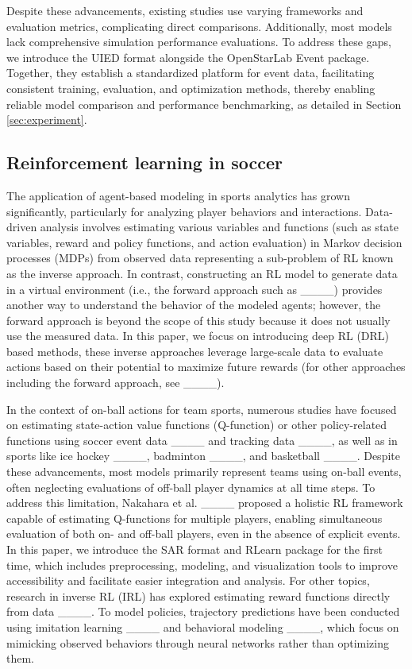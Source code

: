 Despite these advancements, existing studies use varying frameworks and evaluation metrics, complicating direct comparisons. Additionally, most models lack comprehensive simulation performance evaluations. To address these gaps, we introduce the UIED format alongside the OpenStarLab Event package. Together, they establish a standardized platform for event data, facilitating consistent training, evaluation, and optimization methods, thereby enabling reliable model comparison and performance benchmarking, as detailed in Section \ref{sec:experiment}.

\subsection{Reinforcement learning in soccer}
\label{ssec:related_rl_soccer}
The application of agent-based modeling in sports analytics has grown significantly, particularly for analyzing player behaviors and interactions. 
Data-driven analysis involves estimating various variables and functions (such as state variables, reward and policy functions, and action evaluation) in Markov decision processes (MDPs) from observed data representing a sub-problem of RL known as the inverse approach. In contrast, constructing an RL model to generate data in a virtual environment (i.e., the forward approach such as ____) provides another way to understand the behavior of the modeled agents; however, the forward approach is beyond the scope of this study because it does not usually use the measured data. In this paper, we focus on introducing deep RL (DRL) based methods, these inverse approaches leverage large-scale data to evaluate actions based on their potential to maximize future rewards (for other approaches including the forward approach, see ____).

In the context of on-ball actions for team sports, numerous studies have focused on estimating state-action value functions (Q-function) or other policy-related functions using soccer event data ____ and tracking data ____, as well as in sports like ice hockey ____, badminton ____, and basketball ____. 
Despite these advancements, most models primarily represent teams using on-ball events, often neglecting evaluations of off-ball player dynamics at all time steps. To address this limitation, Nakahara et al. ____ proposed a holistic RL framework capable of estimating Q-functions for multiple players, enabling simultaneous evaluation of both on- and off-ball players, even in the absence of explicit events. In this paper, we introduce the SAR format and RLearn package for the first time, which includes preprocessing, modeling, and visualization tools to improve accessibility and facilitate easier integration and analysis.
For other topics, research in inverse RL (IRL) has explored estimating reward functions directly from data ____. To model policies, trajectory predictions have been conducted using imitation learning ____ and behavioral modeling ____, which focus on mimicking observed behaviors through neural networks rather than optimizing them.